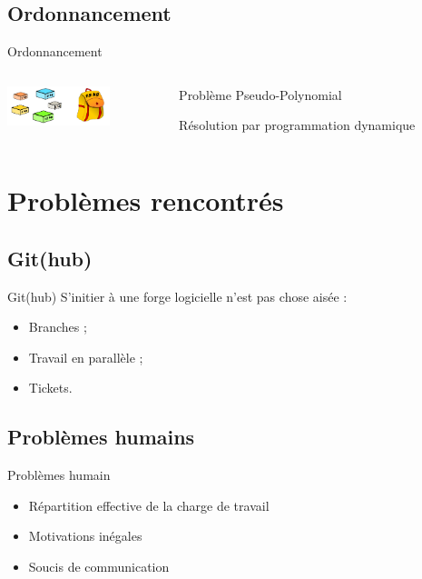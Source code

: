 \documentclass{beamer}
\begin{document}
	\subsection{Ordonnancement}
		\begin{frame}{Ordonnancement}
        \begin{columns}
            \begin{column}{0cm}
                \includegraphics[width=3cm]{images/knapsack.png}
            \end{column}
            \begin{column}{8cm}
                \begin{description}\itemsep15pt
                    \item Problème Pseudo-Polynomial
                    \item Résolution par programmation dynamique
                \end{description}
            \end{column}
        \end{columns}
		\end{frame}

\section{Problèmes rencontrés}
\subsection{Git(hub)}
	\begin{frame}{Git(hub)}
	    S'initier à une forge logicielle n'est pas chose aisée :
		\begin{itemize}
		\setlength{\itemsep}{0.5cm}
			\item Branches ;
			\item Travail en parallèle ;
			\item Tickets.
		\end{itemize}
	\end{frame}
\subsection{Problèmes humains}
	\begin{frame}{Problèmes humain}
	    \begin{itemize}
		\setlength{\itemsep}{1cm}
	        \item Répartition effective de la charge de travail
	        \item Motivations inégales
	        \item Soucis de communication
        \end{itemize}
	\end{frame}
\end{document}
